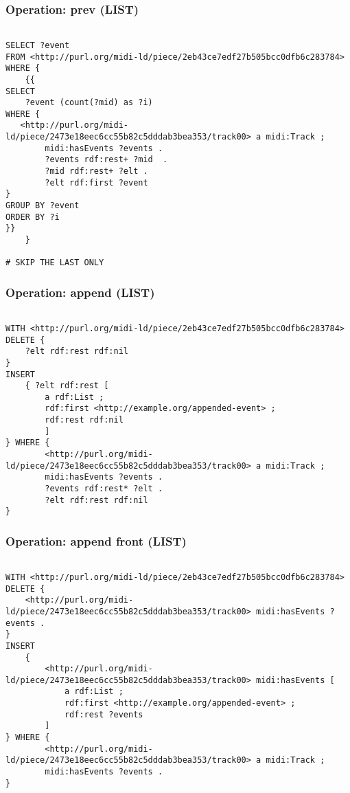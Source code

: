 \subsubsection{Operation: prev (LIST)}
\label{query:LIST:prev}

\begin{lstlisting}[language=sparql]

SELECT ?event 
FROM <http://purl.org/midi-ld/piece/2eb43ce7edf27b505bcc0dfb6c283784>
WHERE {
	{{
SELECT
	?event (count(?mid) as ?i)
WHERE {
   <http://purl.org/midi-ld/piece/2473e18eec6cc55b82c5dddab3bea353/track00> a midi:Track ;
        midi:hasEvents ?events .
		?events rdf:rest+ ?mid  .
		?mid rdf:rest+ ?elt .
		?elt rdf:first ?event 
} 
GROUP BY ?event
ORDER BY ?i
}}
	}
	
# SKIP THE LAST ONLY

\end{lstlisting}

\subsubsection{Operation: append (LIST)}
\label{query:LIST:append}

\begin{lstlisting}[language=sparql]

WITH <http://purl.org/midi-ld/piece/2eb43ce7edf27b505bcc0dfb6c283784>
DELETE {
	?elt rdf:rest rdf:nil
}
INSERT
	{ ?elt rdf:rest [
		a rdf:List ;
		rdf:first <http://example.org/appended-event> ;
		rdf:rest rdf:nil
		] 
} WHERE	{  
		<http://purl.org/midi-ld/piece/2473e18eec6cc55b82c5dddab3bea353/track00> a midi:Track ;
		midi:hasEvents ?events .
		?events rdf:rest* ?elt .
		?elt rdf:rest rdf:nil
}

\end{lstlisting}

\subsubsection{Operation: append front (LIST)}
\label{query:LIST:append_front}

\begin{lstlisting}[language=sparql]

WITH <http://purl.org/midi-ld/piece/2eb43ce7edf27b505bcc0dfb6c283784>
DELETE {
	<http://purl.org/midi-ld/piece/2473e18eec6cc55b82c5dddab3bea353/track00> midi:hasEvents ?events .
}
INSERT
	{ 
		<http://purl.org/midi-ld/piece/2473e18eec6cc55b82c5dddab3bea353/track00> midi:hasEvents [
			a rdf:List ;
			rdf:first <http://example.org/appended-event> ;
			rdf:rest ?events
		] 
} WHERE	{  
		<http://purl.org/midi-ld/piece/2473e18eec6cc55b82c5dddab3bea353/track00> a midi:Track ;
		midi:hasEvents ?events .
}

\end{lstlisting}

